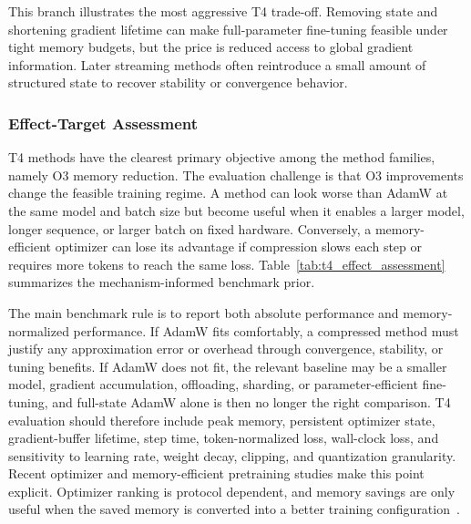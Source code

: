 This branch illustrates the most aggressive T4 trade-off.  Removing state and
shortening gradient lifetime can make full-parameter fine-tuning feasible
under tight memory budgets, but the price is reduced access to global gradient
information.  Later streaming methods often reintroduce a small amount of
structured state to recover stability or convergence behavior.

\subsubsection{Effect-Target Assessment}
\label{sec:t4-effect-assessment}

T4 methods have the clearest primary objective among the method families, namely O3 memory reduction.  The evaluation challenge is that
O3 improvements change the feasible training regime.  A method can look worse
than AdamW at the same model and batch size but become useful when it enables
a larger model, longer sequence, or larger batch on fixed hardware.  Conversely,
a memory-efficient optimizer can lose its advantage if compression slows each
step or requires more tokens to reach the same loss.  Table~\ref{tab:t4_effect_assessment}
summarizes the mechanism-informed benchmark prior.



The main benchmark rule is to report both absolute performance and
memory-normalized performance.  If AdamW fits comfortably, a compressed method
must justify any approximation error or overhead through convergence,
stability, or tuning benefits.  If AdamW does not fit, the relevant baseline
may be a smaller model, gradient accumulation, offloading, sharding, or
parameter-efficient fine-tuning, and full-state AdamW alone is then no longer
the right comparison.  T4
evaluation should therefore include peak memory, persistent optimizer state,
gradient-buffer lifetime, step time, token-normalized loss, wall-clock loss,
and sensitivity to learning rate, weight decay, clipping, and quantization
granularity.  Recent optimizer and memory-efficient pretraining studies make
this point explicit.  Optimizer ranking is protocol dependent, and memory
savings are only useful when the saved memory is converted into a better
training configuration~\citep{zhao2025deconstructing,semenov2025benchmarking,wen2025fantastic,glentis2025scalable}.
